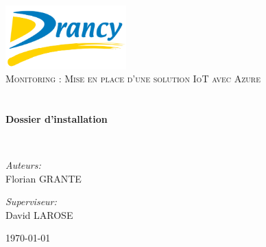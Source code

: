 \begin{titlepage}
\begin{center}

\includegraphics[width=0.35\textwidth]{./images/logo}~\\[1cm]

\textsc{\LARGE Monitoring : Mise en place d'une solution IoT avec Azure}\\[1.5cm]

\textsc{\Large }\\[0.5cm]

\HRule \\[0.4cm]

{\huge \bfseries Dossier d'installation\\[0.4cm] }

\HRule \\[1.5cm]

\begin{minipage}{0.4\textwidth}
\begin{flushleft} \large
\emph{Auteurs:}\\
Florian \textsc{GRANTE}\\
\end{flushleft}
\end{minipage}
\begin{minipage}{0.4\textwidth}
\begin{flushright} \large
\emph{Superviseur:} \\
David \textsc{LAROSE}
\end{flushright}
\end{minipage}

\vfill

{\large \today}

\end{center}
\end{titlepage}